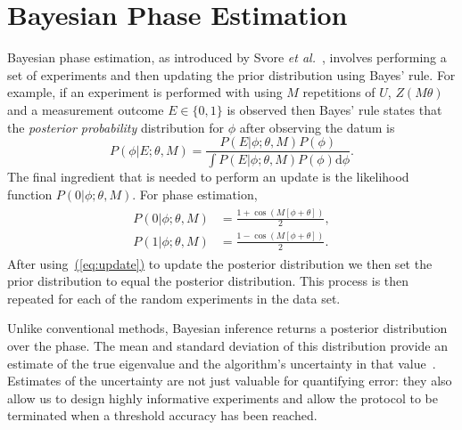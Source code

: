 \documentclass[aps,pra,amsmath,twocolumn,amssymb,superscriptaddress]{revtex4-1}
\newcommand{\eq}[1]{\hyperref[eq:#1]{(\ref*{eq:#1})}}
\newcommand{\etal}{\emph{et al.}}
\begin{document}

\section{Bayesian Phase Estimation}
\label{sec:bayesian-phase-est}


Bayesian phase estimation, as introduced by Svore \etal~\cite{SHF14}, involves performing a 
set of experiments and then updating the prior distribution using Bayes' rule.
For example, if an experiment is performed with using $M$ repetitions of $U$,
$Z(M \theta)$ and a measurement outcome $E\in \{0,1\}$ is observed then Bayes'
rule states that the \emph{posterior probability} distribution for $\phi$
after observing the datum is
\begin{equation}
P(\phi|E;\theta,M) = \frac{P(E|\phi;\theta,M)P(\phi)}{\int P(E|\phi;\theta,M)P(\phi)\mathrm{d}{\phi}}.\label{eq:update}
\end{equation}
The final ingredient that is needed to perform an update is the likelihood
function $P(0|\phi;\theta,M)$. For phase estimation,
\begin{gather}
    \label{eq:likenodecohere}
    \begin{aligned}
        P(0|\phi;\theta,M) & = \frac{1+\cos(M[\phi +\theta])}{2},\\
        P(1|\phi;\theta,M) & = \frac{1-\cos(M[\phi +\theta])}{2}.
    \end{aligned}
\end{gather}
After using~\eq{update} to update the posterior distribution we then set the prior distribution to equal the posterior distribution.  This process is then repeated for each of the random experiments in the data set.

Unlike conventional methods, Bayesian inference returns a posterior
distribution over the phase. The mean and standard deviation of this
distribution provide an estimate of the true eigenvalue and the algorithm's
uncertainty in that value~\cite{granade_robust_2012,ferrie_high_2014}. Estimates of
the uncertainty are not just valuable for quantifying error: they also allow us to design highly informative experiments 
 and allow the protocol to be terminated when a threshold accuracy has been reached.
\end{document}
